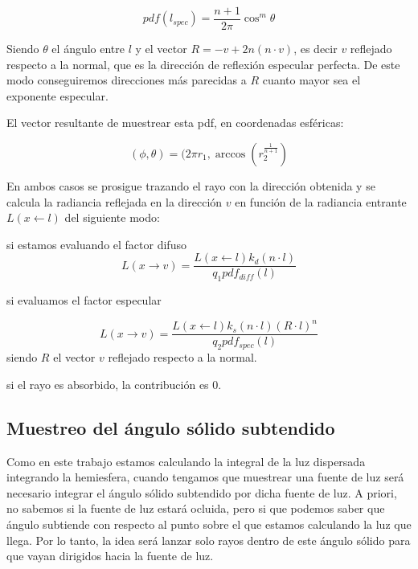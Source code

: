 \begin{equation}
pdf(l_{spec}) = \frac{n + 1}{2\pi}\cos^m\theta
\end{equation}

Siendo $\theta$ el ángulo entre $l$ y el vector $R = -v + 2n(n \cdot v)$, es decir $v$ reflejado respecto a la normal, que es la dirección de reflexión especular perfecta. De este modo conseguiremos direcciones más parecidas a $R$ cuanto mayor sea el exponente especular.

\medskip

El vector resultante de muestrear esta pdf, en coordenadas esféricas:

\begin{equation}
(\phi, \theta) = (2\pi r_1, \arccos(r_2^{\frac{1}{n+1}}) 
\end{equation}

En ambos casos se prosigue trazando el rayo con la dirección obtenida y se calcula la radiancia reflejada en la dirección $v$ en función de la radiancia entrante $L(x \gets l)$ del siguiente modo:
\medskip

si estamos evaluando el factor difuso
\begin{equation}
L(x \to v) = \frac{L(x \gets l)k_d(n \cdot l)}{q_1 pdf_{diff}(l)}
\end{equation}

si evaluamos el factor especular

\begin{equation}
L(x \to v) = \frac{L(x \gets l)k_s(n \cdot l)(R \cdot l)^n}{q_2 pdf_{spec}(l)}
\end{equation}
siendo $R$ el vector $v$ reflejado respecto a la normal.

si el rayo es absorbido, la contribución es $0$.




\clearpage

\subsection{Muestreo del ángulo sólido subtendido}
\label{sample_solid}

Como en este trabajo estamos calculando la integral de la luz dispersada integrando la hemiesfera, cuando tengamos que muestrear una fuente de luz será necesario integrar el ángulo sólido subtendido por dicha fuente de luz. A priori, no sabemos si la fuente de luz estará ocluida, pero si que podemos saber que ángulo subtiende con respecto al punto sobre el que estamos calculando la luz que llega. Por lo tanto, la idea será lanzar solo rayos dentro de este ángulo sólido para que vayan dirigidos hacia la fuente de luz.

